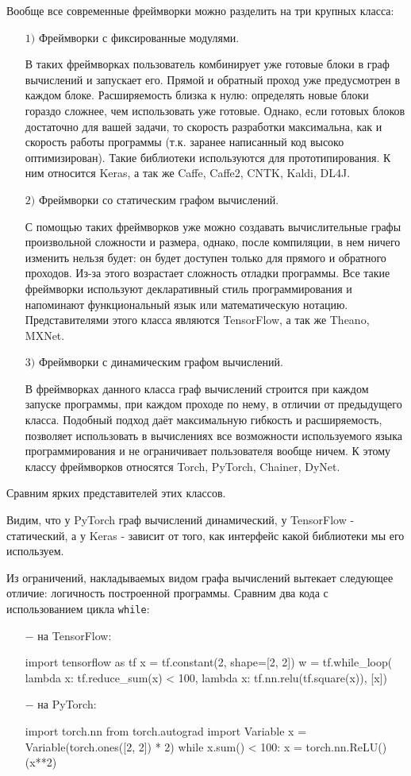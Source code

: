 \documentclass[a4paper]{article}
\begin{document}
Вообще все современные фреймворки можно разделить на три крупных класса:
\begin{itemize}
	\item[$1)$] Фреймворки с фиксированные модулями.
	
	В таких фреймворках пользователь комбинирует уже готовые блоки в граф вычислений и запускает его. Прямой и обратный проход уже предусмотрен в каждом блоке. Расширяемость близка к нулю: определять новые блоки гораздо сложнее, чем использовать уже готовые. Однако, если готовых блоков достаточно для вашей задачи, то скорость разработки максимальна, как и скорость работы программы (т.к. заранее написанный код высоко оптимизирован). Такие библиотеки используются для прототипирования. К ним относится Keras, а так же Caffe, Caffe2, CNTK, Kaldi, DL4J.
	\item[$2)$] Фреймворки со статическим графом вычислений.
	
С помощью таких фреймворков уже можно создавать вычислительные графы произвольной сложности и размера, однако, после компиляции, в нем ничего изменить нельзя будет: он будет доступен только для прямого и обратного проходов. Из-за этого возрастает сложность отладки программы. Все такие фреймворки используют декларативный стиль программирования и напоминают функциональный язык или математическую нотацию. Представителями этого класса являются TensorFlow, а так же Theano, MXNet.
	\item[$3)$] Фреймворки с динамическим графом вычислений.
	
В фреймворках данного класса граф вычислений строится при каждом запуске программы, при каждом проходе по нему, в отличии от предыдущего класса. Подобный подход даёт максимальную гибкость и расширяемость, позволяет использовать в вычислениях все возможности используемого языка программирования и не ограничивает пользователя вообще ничем. К этому классу фреймворков относятся Torch, PyTorch, Chainer, DyNet.
\end{itemize}

Сравним ярких представителей этих классов.

Видим, что у PyTorch граф вычислений динамический, у TensorFlow - статический, а у Keras - зависит от того, как интерфейс какой библиотеки мы его используем.

Из ограничений, накладываемых видом графа вычислений вытекает следующее отличие: логичность построенной программы. Сравним два кода с использованием цикла \verb'while':
\begin{itemize}
	\item[$-$] на TensorFlow:
\begin{listing}{1}
import tensorflow as tf
x = tf.constant(2, shape=[2, 2]) 
w = tf.while_loop(
	lambda x: tf.reduce_sum(x) < 100, 
	lambda x: tf.nn.relu(tf.square(x)), 
	[x])
\end{listing}
	\item[$-$] на PyTorch:
\begin{listing}{1}
import torch.nn
from torch.autograd import Variable
x = Variable(torch.ones([2, 2]) * 2) 
while x.sum() < 100:
	x = torch.nn.ReLU()(x**2)
\end{listing}
\end{itemize}
\end{document}
